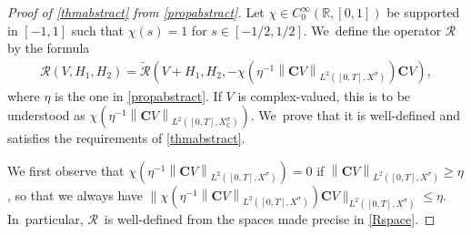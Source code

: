 \documentclass[10pt]{amsart}
\newcommand\bnor[2]{\bigl\|#1\bigr\|_{#2}}%
\theoremstyle{definition}
\newcommand{\R}{\mathbb{R}}
\newcommand{\bC}{\boldsymbol{C}}
\newcommand\nor[2]{\left\|#1\right\|_{#2}}
\begin{document}
\begin{proof}[Proof of \cref{thmabstract} from \cref{propabstract}]
Let $\chi\in C^{\infty}_{0}(\R,[0,1])$ be supported in $[-1,1]$ such that $\chi(s)=1$ for $s\in [-1/2,1/2]$. We~define the operator $\mathcal{R}$ by the formula
\begin{align}\label{defR}
\mathcal{R}(V,H_{1},H_{2})=\mathcal{\widetilde{R}}(V+H_{1},H_{2},- \chi(\eta^{-1} \nor{\bC V}{L^{2}([0,T],X^{\sigma})}) \bC V),
\end{align}
where $\eta$ is the one in \cref{propabstract}. If $V$ is complex-valued, this is to be understood as $\chi(\eta^{-1} \nor{\bC V}{L^{2}([0,T],X^{\sigma}_{\mathbb{C}})})$. We~prove that it is well-defined and satisfies the requirements of \cref{thmabstract}.

We first observe that $\chi(\eta^{-1} \nor{\bC V}{L^{2}([0,T],X^{\sigma})}) =0$ if $\nor{ \bC V}{L^{2}([0,T],X^{\sigma})}\geq \eta$, so that we always have $\bnor{ \chi(\eta^{-1} \nor{ \bC V}{L^{2}([0,T],X^{\sigma})}) \bC V}{L^{2}([0,T],X^{\sigma})}\leq \eta$. In~particular, $\mathcal{R}$~is well-defined from the spaces made precise in \eqref{Rspace}.


\end{proof}
\end{document}
